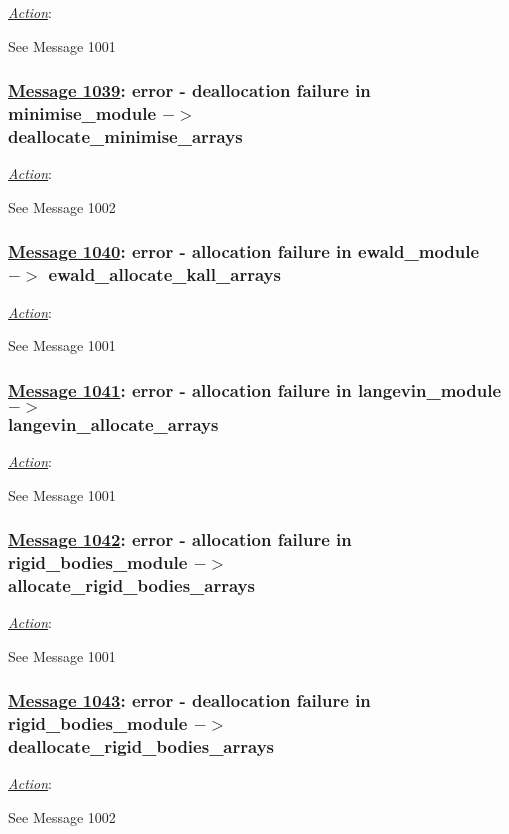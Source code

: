 \noindent \underline{\em Action}:

See Message 1001

\subsubsection*{\underline{Message 1039}: error - deallocation failure in minimise\_module $->$ \\
\noindent deallocate\_minimise\_arrays}

\noindent \underline{\em Action}:

See Message 1002

\subsubsection*{\underline{Message 1040}: error - allocation failure in ewald\_module $->$ ewald\_allocate\_kall\_arrays}

\noindent \underline{\em Action}:

See Message 1001

\subsubsection*{\underline{Message 1041}: error - allocation failure in langevin\_module $->$ \\
\noindent langevin\_allocate\_arrays}

\noindent \underline{\em Action}:

See Message 1001

\subsubsection*{\underline{Message 1042}: error - allocation failure in rigid\_bodies\_module $->$ \\
\noindent allocate\_rigid\_bodies\_arrays}

\noindent \underline{\em Action}:

See Message 1001

\subsubsection*{\underline{Message 1043}: error - deallocation failure in rigid\_bodies\_module $->$ \\
\noindent deallocate\_rigid\_bodies\_arrays}

\noindent \underline{\em Action}:

See Message 1002

